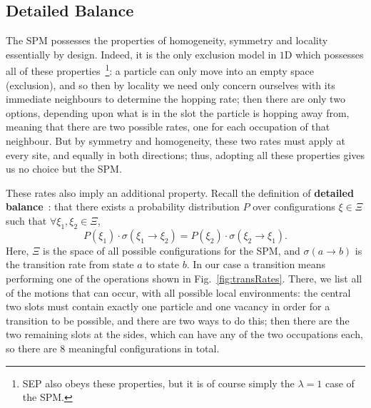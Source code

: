 \subsection{Detailed Balance} \label{sec:dbProof}
The SPM possesses the properties of homogeneity, symmetry and locality essentially by design. Indeed, it is
the only exclusion model in $1$D which possesses all of these
properties~\footnote{SEP also obeys these properties, but it is of course 
simply the $\lambda=1$ case of the SPM.}: a particle can only move into
an empty space (exclusion), and so then by locality we need only concern ourselves with its immediate 
neighbours to determine the hopping rate; then there are only two options, depending upon what is in the 
slot the particle is hopping away from, meaning that there are two possible rates, one for each occupation
of that neighbour. But by symmetry and homogeneity, these two rates must apply at every site, and equally
in both directions; thus, adopting all these properties gives us no choice but the SPM.

These rates also imply an additional property. Recall the definition of 
\textbf{detailed balance}~\cite{gardiner1985}:
that there exists
a probability distribution $P$ over configurations $\xi \in \Xi$ such that 
$\forall \xi_1 , \xi_2 \in \Xi $,
  \begin{equation} \label{eq:dbDefn}
    P(\xi_1) \cdot \sigma(\xi_1 \rightarrow \xi_2) = P(\xi_2) \cdot \sigma(\xi_2 \rightarrow \xi_1).
  \end{equation}  
Here, $\Xi$ is the space of all possible configurations for the SPM, and 
$\sigma(a \rightarrow b)$ is the transition rate from state $a$ to state $b$. In our case a transition
means performing one of the operations shown in Fig.~\ref{fig:transRates}. There,
we
list all of the motions that can occur, with all possible local environments: the central two slots must
contain exactly one particle and one vacancy in order for a transition to be possible, and there are two
ways to do this; then there are the two remaining slots at the sides, which can have any of the two
occupations each, so there are $8$ meaningful configurations in total.

